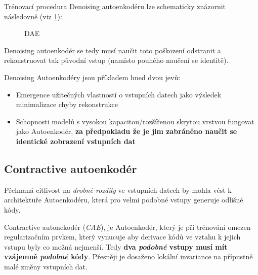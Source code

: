 Trénovací procedura Denoising autoenkodéru lze schematicky znázornit následovně (viz \ref{fig:denoising_autoencoder}):

\begin{figure}[h]
    \centering
    \caption{DAE}
    \label{fig:denoising_autoencoder}
\end{figure}

Denoising autoenkodér se tedy musí naučit toto poškození odstranit a rekonstruovat tak původní vstup (namísto pouhého naučení se identitě).

Denoising Autoenkodéry jsou příkladem hned dvou jevů:
\begin{itemize}
    \item Emergence užitečných vlastností o vstupních datech jako výsledek minimalizace chyby rekonstrukce
    \item Schopnosti modelů s vysokou kapacitou/rozšířenou skrytou vrstvou fungovat jako Autoenkodér, \textbf{za předpokladu že je jim zabráněno naučit se identické zobrazení vstupních dat}
\end{itemize}

\subsection{Contractive autoenkodér}
Přehnaná citlivost na \emph{drobné rozdíly} ve vstupních datech by mohla vést k architektuře Autoenkodéru, která pro velmi podobné vstupy generuje odlišné kódy.

Contractive autonekodér (\emph{CAE}), je Autoenkodér, který je při trénování omezen regularizačním prvkem,
který vynucuje aby derivace kódů ve vztahu k jejich vstupu byly co možná nejmenší.
Tedy \textbf{dva \emph{podobné} vstupy musí mít vzájemně \emph{podobné} kódy}.
Přesněji je dosaženo lokální invariance na přípustně malé změny vstupních dat.

